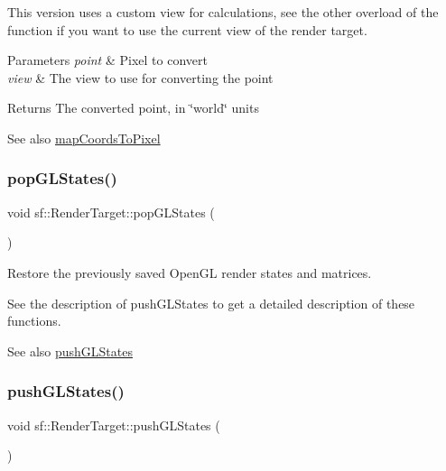 This version uses a custom view for calculations, see the other overload of the function if you want to use the current view of the render target.


\begin{DoxyParams}{Parameters}
{\em point} & Pixel to convert \\
\hline
{\em view} & The view to use for converting the point\\
\hline
\end{DoxyParams}
\begin{DoxyReturn}{Returns}
The converted point, in \char`\"{}world\char`\"{} units
\end{DoxyReturn}
\begin{DoxySeeAlso}{See also}
\hyperlink{classsf_1_1_render_target_ad92a9f0283aa5f3f67e473c1105b68cf}{map\+Coords\+To\+Pixel} 
\end{DoxySeeAlso}
\mbox{\label{classsf_1_1_render_target_ad5a98401113df931ddcd54c080f7aa8e}} 
\subsubsection{\texorpdfstring{pop\+G\+L\+States()}{popGLStates()}}
{\footnotesize\ttfamily void sf\+::\+Render\+Target\+::pop\+G\+L\+States (\begin{DoxyParamCaption}{ }\end{DoxyParamCaption})}



Restore the previously saved Open\+GL render states and matrices. 

See the description of push\+G\+L\+States to get a detailed description of these functions.

\begin{DoxySeeAlso}{See also}
\hyperlink{classsf_1_1_render_target_a8d1998464ccc54e789aaf990242b47f7}{push\+G\+L\+States} 
\end{DoxySeeAlso}
\mbox{\label{classsf_1_1_render_target_a8d1998464ccc54e789aaf990242b47f7}} 
\subsubsection{\texorpdfstring{push\+G\+L\+States()}{pushGLStates()}}
{\footnotesize\ttfamily void sf\+::\+Render\+Target\+::push\+G\+L\+States (\begin{DoxyParamCaption}{ }\end{DoxyParamCaption})}



